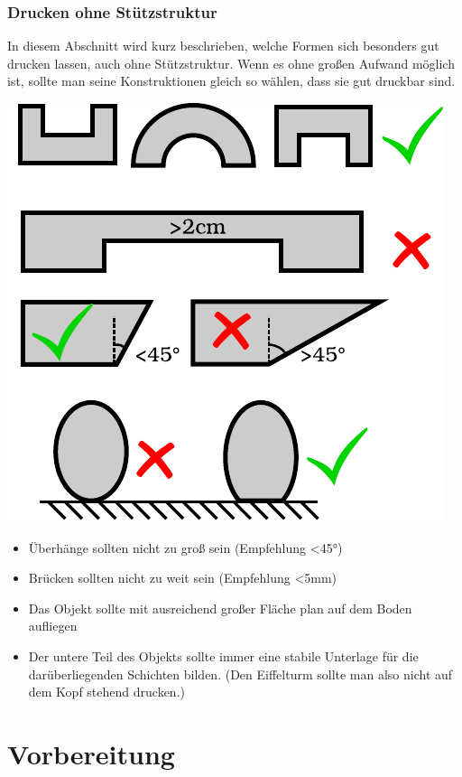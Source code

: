 \documentclass{\basedir/fablab-document}
\begin{document}
\subsubsection{Drucken ohne Stützstruktur}
In diesem Abschnitt wird kurz beschrieben, welche Formen sich besonders gut drucken lassen, auch ohne Stützstruktur. Wenn es ohne großen Aufwand möglich ist, sollte man seine Konstruktionen gleich so wählen, dass sie gut druckbar sind.
\begin{center}
\includegraphics{./zeichnungen/formen.pdf}
\end{center}
\begin{itemize}
\item Überhänge sollten nicht zu groß sein
(Empfehlung {\textless}45°)
\item Brücken sollten nicht zu weit sein (Empfehlung {\textless}5mm)
\item Das Objekt sollte mit ausreichend großer Fläche plan auf dem Boden aufliegen
\item Der untere Teil des Objekts sollte immer eine stabile Unterlage für die darüberliegenden Schichten bilden. (Den Eiffelturm sollte man also nicht auf dem Kopf stehend drucken.)
\end{itemize}
\newpage


\section{Vorbereitung}
\end{document}
